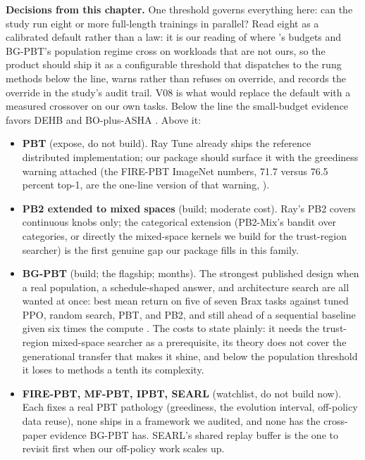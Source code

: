 \begin{decisions}
\noindent\textbf{Decisions from this chapter.} One threshold governs
everything here: can the study run eight or more full-length trainings
in parallel? Read eight as a calibrated default rather than a law: it
is our reading of where \citet{eimer2023hyperparameters}'s budgets and
BG-PBT's population regime cross on workloads that are not ours, so
the product should ship it as a configurable threshold that dispatches
to the rung methods below the line, warns rather than refuses on
override, and records the override in the study's audit trail. V08
is what would replace the default with a measured crossover on our own
tasks. Below the line the small-budget evidence favors DEHB and
BO-plus-ASHA \citep{eimer2023hyperparameters}. Above it:
\begin{itemize}[leftmargin=1.3em, itemsep=2pt]
\item \textbf{PBT} (expose, do not build). Ray Tune already ships the
reference distributed implementation; our package should surface it
with the greediness warning attached (the FIRE-PBT ImageNet numbers,
71.7 versus 76.5 percent top-1, are the one-line version of that
warning, \citealp{dalibard2021firepbt}).
\item \textbf{PB2 extended to mixed spaces} (build; moderate cost).
Ray's PB2 covers continuous knobs only; the categorical extension
(PB2-Mix's bandit over categories, or directly the mixed-space kernels
we build for the trust-region searcher) is the first genuine gap our
package fills in this family.
\item \textbf{BG-PBT} (build; the flagship; months). The strongest
published design when a real population, a schedule-shaped answer, and
architecture search are all wanted at once: best mean return on five
of seven Brax tasks against tuned PPO, random search, PBT, and PB2,
and still ahead of a sequential baseline given six times the compute
\citep{wan2022bgpbt}. The costs to state plainly: it needs the
trust-region mixed-space searcher as a prerequisite, its theory does
not cover the generational transfer that makes it shine, and below the
population threshold it loses to methods a tenth its complexity.
\item \textbf{FIRE-PBT, MF-PBT, IPBT, SEARL} (watchlist, do not build
now). Each fixes a real PBT pathology (greediness, the evolution
interval, off-policy data reuse), none ships in a framework we
audited, and none has the cross-paper evidence BG-PBT has. SEARL's
shared replay buffer is the one to revisit first when our off-policy
work scales up.
\end{itemize}
\end{decisions}

